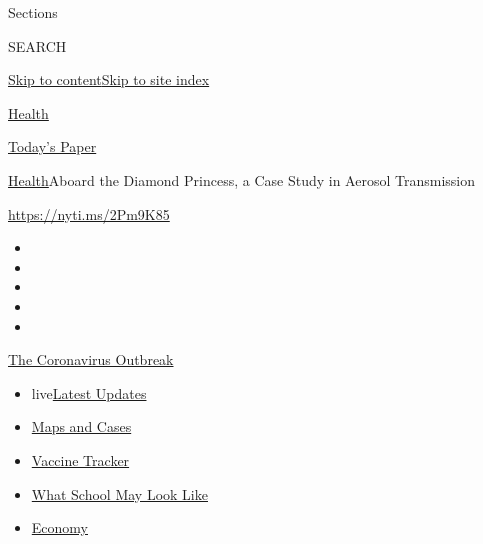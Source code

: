 Sections

SEARCH

\protect\hyperlink{site-content}{Skip to
content}\protect\hyperlink{site-index}{Skip to site index}

\href{https://www.nytimes.com/section/health}{Health}

\href{https://myaccount.nytimes.com/auth/login?response_type=cookie\&client_id=vi}{}

\href{https://www.nytimes.com/section/todayspaper}{Today's Paper}

\href{/section/health}{Health}\textbar{}Aboard the Diamond Princess, a
Case Study in Aerosol Transmission

\url{https://nyti.ms/2Pm9K85}

\begin{itemize}
\item
\item
\item
\item
\item
\end{itemize}

\href{https://www.nytimes.com/news-event/coronavirus?action=click\&pgtype=Article\&state=default\&region=TOP_BANNER\&context=storylines_menu}{The
Coronavirus Outbreak}

\begin{itemize}
\tightlist
\item
  live\href{https://www.nytimes.com/2020/08/01/world/coronavirus-covid-19.html?action=click\&pgtype=Article\&state=default\&region=TOP_BANNER\&context=storylines_menu}{Latest
  Updates}
\item
  \href{https://www.nytimes.com/interactive/2020/us/coronavirus-us-cases.html?action=click\&pgtype=Article\&state=default\&region=TOP_BANNER\&context=storylines_menu}{Maps
  and Cases}
\item
  \href{https://www.nytimes.com/interactive/2020/science/coronavirus-vaccine-tracker.html?action=click\&pgtype=Article\&state=default\&region=TOP_BANNER\&context=storylines_menu}{Vaccine
  Tracker}
\item
  \href{https://www.nytimes.com/interactive/2020/07/29/us/schools-reopening-coronavirus.html?action=click\&pgtype=Article\&state=default\&region=TOP_BANNER\&context=storylines_menu}{What
  School May Look Like}
\item
  \href{https://www.nytimes.com/live/2020/07/31/business/stock-market-today-coronavirus?action=click\&pgtype=Article\&state=default\&region=TOP_BANNER\&context=storylines_menu}{Economy}
\end{itemize}

